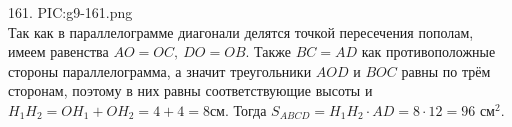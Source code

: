 161. {{PIC:g9-161.png}}\\
Так как в параллелограмме диагонали делятся точкой пересечения пополам, имеем равенства $AO=OC,\ DO=OB.$ Также $BC=AD$ как противоположные стороны параллелограмма, а значит треугольники $AOD$ и $BOC$ равны по трём сторонам, поэтому в них равны соответствующие высоты и $H_1H_2=OH_1+OH_2=4+4=8$см. Тогда $S_{ABCD}=H_1H_2\cdot AD=8\cdot12=96\text{ см}^2.$\\
